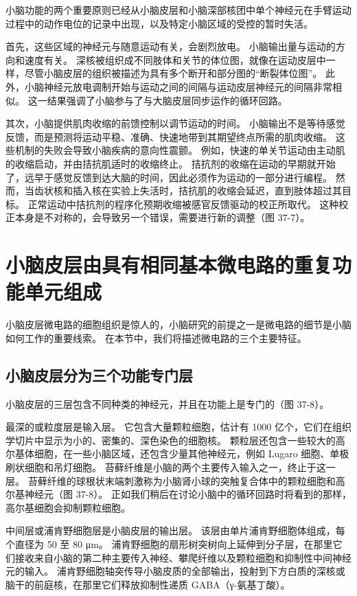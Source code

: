 小脑功能的两个重要原则已经从小脑皮层和小脑深部核团中单个神经元在手臂运动过程中的动作电位的记录中出现，以及特定小脑区域的受控的暂时失活。

首先，这些区域的神经元与随意运动有关，会剧烈放电。 小脑输出量与运动的方向和速度有关。 深核被组织成不同肢体和关节的体位图，就像在运动皮层中一样，尽管小脑皮层的组织被描述为具有多个断开和部分图的“断裂体位图”。 此外，小脑神经元放电调制开始与运动之间的间隔与运动皮层神经元的间隔非常相似。 这一结果强调了小脑参与了与大脑皮层同步运作的循环回路。

其次，小脑提供肌肉收缩的前馈控制以调节运动的时间。 小脑输出不是等待感觉反馈，而是预测将运动平稳、准确、快速地带到其期望终点所需的肌肉收缩。 这些机制的失败会导致小脑疾病的意向性震颤。 例如，快速的单关节运动由主动肌的收缩启动，并由拮抗肌适时的收缩终止。 拮抗剂的收缩在运动的早期就开始了，远早于感觉反馈到达大脑的时间，因此必须作为运动的一部分进行编程。 然而，当齿状核和插入核在实验上失活时，拮抗肌的收缩会延迟，直到肢体超过其目标。 正常运动中拮抗剂的程序化预期收缩被感官反馈驱动的校正所取代。 这种校正本身是不对称的，会导致另一个错误，需要进行新的调整（图 37-7）。

\section{小脑皮层由具有相同基本微电路的重复功能单元组成}
小脑皮层微电路的细胞组织是惊人的，小脑研究的前提之一是微电路的细节是小脑如何工作的重要线索。 在本节中，我们将描述微电路的三个主要特征。

\subsection{小脑皮层分为三个功能专门层}
小脑皮层的三层包含不同种类的神经元，并且在功能上是专门的（图 37-8）。

最深的或粒度层是输入层。 它包含大量颗粒细胞，估计有 1000 亿个，它们在组织学切片中显示为小的、密集的、深色染色的细胞核。 颗粒层还包含一些较大的高尔基体细胞，在一些小脑区域，还包含少量其他神经元，例如 Lugaro 细胞、单极刷状细胞和吊灯细胞。 苔藓纤维是小脑的两个主要传入输入之一，终止于这一层。 苔藓纤维的球根状末端刺激称为小脑肾小球的突触复合体中的颗粒细胞和高尔基神经元（图 37-8）。 正如我们稍后在讨论小脑中的循环回路时将看到的那样，高尔基细胞会抑制颗粒细胞。

中间层或浦肯野细胞层是小脑皮层的输出层。 该层由单片浦肯野细胞体组成，每个直径为 50 至 80 μm。 浦肯野细胞的扇形树突树向上延伸到分子层，在那里它们接收来自小脑的第二种主要传入神经、攀爬纤维以及颗粒细胞和抑制性中间神经元的输入。 浦肯野细胞轴突传导小脑皮质的全部输出，投射到下方白质的深核或脑干的前庭核，在那里它们释放抑制性递质 GABA（γ-氨基丁酸）。

